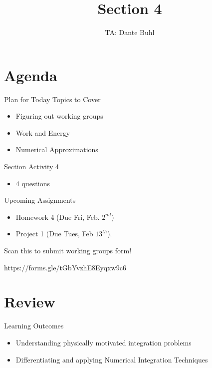 \documentclass{beamer}
\title{Section 4}
\author{TA: Dante Buhl}
\institute{UCSC Math-19B}
\begin{document}
\newcommand{\bmp}[1]{\begin{minipage}{#1\textwidth}}
\newcommand{\emp}{\end{minipage}}


\frame{\titlepage}

\section{Agenda}
\begin{frame}{Plan for Today}
    Topics to Cover
    \begin{itemize}
        \item Figuring out working groups
        \item Work and Energy
        \item Numerical Approximations
    \end{itemize}
    Section Activity 4
    \begin{itemize}
        \item 4 questions
    \end{itemize}
    Upcoming Assignments
    \begin{itemize}
        \item Homework 4 (Due Fri, Feb. $2^{nd}$)
        \item Project 1 (Due Tues, Feb $13^{th}$).
    \end{itemize}
\end{frame}


\begin{frame}{Scan this to submit working groups form!}

    https://forms.gle/tGbYvzhE8Eyqxw9c6

\end{frame}

\section{Review}
\begin{frame}{Learning Outcomes}
    \begin{itemize}
        \item Understanding physically motivated integration problems
        \item Differentiating and applying Numerical Integration Techniques
    \end{itemize}
\end{frame}
\end{document}
